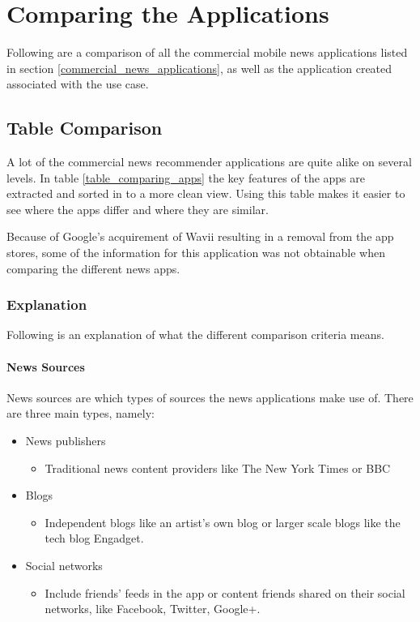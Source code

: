 \chapter{Comparing the Applications}
\label{chapter_comparing_applications}
Following are a comparison of all the commercial mobile news applications listed in section \ref{commercial_news_applications}, as well as the application created associated with the use case.


\section{Table Comparison}
A lot of the commercial news recommender applications are quite alike on several levels. In table \ref{table_comparing_apps} the key features of the apps are extracted and sorted in to a more clean view. Using this table makes it easier to see where the apps differ and where they are similar. 

Because of Google's acquirement of Wavii resulting in a removal from the app stores, some of the information for this application was not obtainable when comparing the different news apps.

\subsection{Explanation}
Following is an explanation of what the different comparison criteria means.

\subsubsection{News Sources}
News sources are which types of sources the news applications make use of. There are three main types, namely:

\begin{itemize}
	\item News publishers
	\begin{itemize}
		\item Traditional news content providers like The New York Times or BBC
	\end{itemize}

	\item Blogs
	\begin{itemize}
		\item Independent blogs like an artist's own blog or larger scale blogs like the tech blog Engadget.
	\end{itemize}

	\item Social networks
	\begin{itemize}
		\item Include friends' feeds in the app or content friends shared on their social networks, like Facebook, Twitter, Google+.
	\end{itemize}
\end{itemize}

